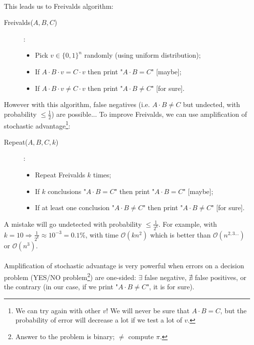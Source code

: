 \begin{itemize}
	\paragraph{}
	This leads us to Freivalds algorithm:
	\begin{description}
	\item[Freivalds($A,B,C$)]:\\
	\begin{itemize}
		\item Pick $v\in\{0,1\}^n$ randomly (using uniform distribution);
		\item If $A\cdot B\cdot v = C\cdot v$ then print "$A\cdot B=C$" [maybe];
		\item If $A\cdot B\cdot v \neq C\cdot v$ then print "$A\cdot B\neq C$" [for sure].
	\end{itemize}
	\end{description}
	However with this algorithm, false negatives (i.e. $A\cdot B\neq C$ but undected, with probability $\leq \frac{1}{2}$) are possible... To improve Freivalds, we can use amplification of stochastic advantage\footnote{We can try again with other $v$! We will never be sure that $A\cdot B=C$, but the probability of error will decrease a lot if we test a lot of $v$.}:
	\begin{description}
	\item[Repeat($A,B,C,k$)]:\\
	\begin{itemize}
		\item Repeat Freivalds $k$ times;
		\item If $k$ conclusions "$A\cdot B=C$" then print "$A\cdot B=C$" [maybe];
		\item If at least one conclusion "$A\cdot B\neq C$" then print "$A\cdot B\neq C$" [for sure].
	\end{itemize}
	\end{description}
	A mistake will go undetected with probability $\leq \frac{1}{2^k}$. For example, with $k=10\Rightarrow \frac{1}{2^k}\approx 10^{-3}=0.1\%$, with time $\mathcal{O}(kn^{2})$ which is better than $\mathcal{O}(n^{2,3...})$ or $\mathcal{O}(n^{3})$.
	\paragraph{}
	Amplification of stochastic advantage is very powerful when errors on a decision problem (YES/NO problem\footnote{Answer to the problem is binary; $\neq$ compute $\pi$.}) are one-sided: $\exists$ false negative, $\nexists$ false positives, or the contrary (in our case, if we print "$A\cdot B\neq C$", it is for sure).
	

\end{itemize}
